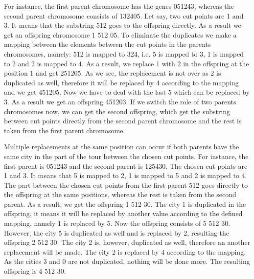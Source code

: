 \documentclass[a4paper, 12pt, headings=standardclasses]{scrartcl}
\begin{document}
For instance, the first parent chromosome has the genes 051243, whereas the second parent chromosome consists of 132405. Let say, two cut points are 1 and 3. It means that the substring 512 goes to the offspring directly. As a result we get an offspring chromosome 1 512 05. To eliminate the duplicates we make a mapping between the elements between the cut points in the parents chromosomes, namely: 512 is mapped to 324, i.e. 5 is mapped to 3, 1 is mapped to 2 and 2 is mapped to 4.  As a result, we replace 1 with 2 in the offspring at the position 1 and get 251205. As we see, the replacement is not over as 2 is duplicated as well, therefore it will be replaced by 4 according to the mapping and we get 451205. Now we have to deal with the last 5 which can be replaced by 3. As a result we get an offspring 451203. If we switch the role of two parents chromosomes now, we can get the second offspring, which get the substring between cut points directly from the second parent chromosome and the rest is taken from the first parent chromosome.\par

Multiple replacements at the same position can occur if both parents have the same city in the part of the tour between the chosen cut points. For instance, the first parent is 051243 and the second parent is 125430. The chosen cut points are 1 and 3.  It means that 5 is mapped to 2, 1 is mapped to 5 and 2 is mapped to 4. The part between the chosen cut points from the first parent 512 goes directly to the offspring at the same positions, whereas the rest is taken from the second parent. As a result, we get the offspring 1 512 30. The city 1 is duplicated in the offspring, it means it will be replaced by another value according to the defined mapping, namely 1 is replaced by 5. Now the offspring consists of 5 512 30. However, the city 5 is duplicated as well and is replaced by 2, resulting the offspring 2 512 30. The city 2 is, however, duplicated as well, therefore an another replacement will be made. The city 2 is replaced by 4 according to the mapping. As the cities 3 and 0 are not duplicated, nothing will be done more. The resulting offspring is 4 512 30. 
\end{document}

